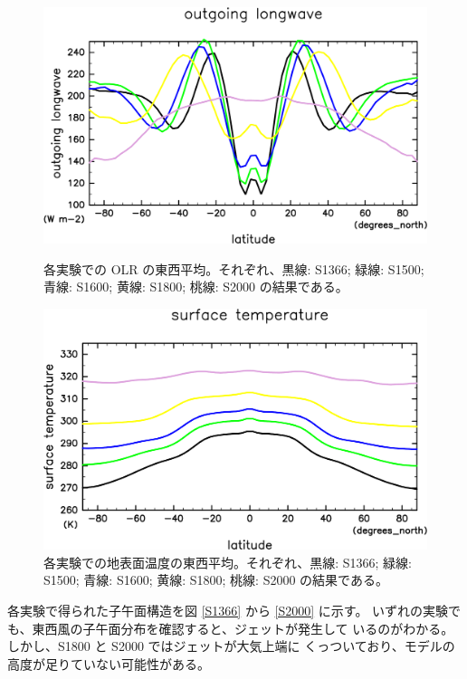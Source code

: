 \documentclass[body]{subfiles}
\begin{document}
\begin{figure}[t]
	\centering
	\begin{minipage}{.45\textwidth}
		\centering
		\includegraphics[width=\textwidth]{OLR-overplot-crop-rotate.pdf}
		\caption[各実験での OLR の東西平均]{
			各実験での OLR の東西平均。それぞれ、黒線: S1366;
			緑線: S1500; 青線: S1600; 黄線: S1800; 桃線: S2000 の結果である。
		}\label{OLR東西平均}
	\end{minipage}
	\hfill
	\begin{minipage}{.45\textwidth}
		\centering
		\includegraphics[width=\textwidth]{SurfTemp-overplot-crop-rotate.pdf}
		\caption[各実験での地表面温度の東西平均]{
			各実験での地表面温度の東西平均。それぞれ、黒線: S1366;
			緑線: S1500; 青線: S1600; 黄線: S1800; 桃線: S2000 の結果である。
		}\label{地表面温度}
	\end{minipage}
\end{figure}

各実験で得られた子午面構造を図 \ref{S1366} から \ref{S2000} に示す。
いずれの実験でも、東西風の子午面分布を確認すると、ジェットが発生して
いるのがわかる。しかし、S1800 と S2000 ではジェットが大気上端に
くっついており、モデルの高度が足りていない可能性がある。
\end{document}
